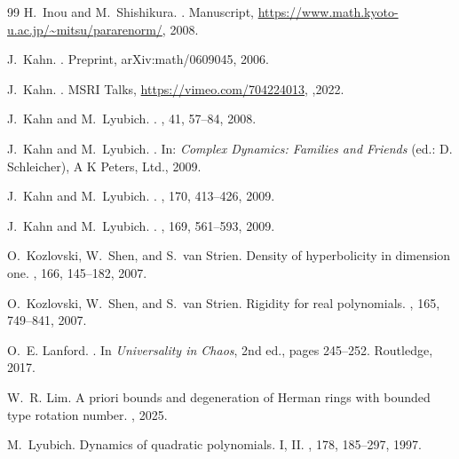 \documentclass[twoside,leqno]{article}
\theoremstyle{plain}
\begin{document}
\begin{thebibliography}{99}
H.~Inou and M.~Shishikura.
.
\newblock Manuscript, \url{https://www.math.kyoto-u.ac.jp/~mitsu/pararenorm/}, 2008.

J.~Kahn.
.
\newblock Preprint, arXiv:math/0609045, 2006.

J.~Kahn.
.
\newblock MSRI Talks, \url{https://vimeo.com/704224013}, 
 ,2022.


J.~Kahn and M.~Lyubich.
.
, 41, 57--84, 2008.

J.~Kahn and M.~Lyubich.
.
\newblock In: {\em Complex Dynamics: Families and Friends} (ed.: D. Schleicher), A K Peters, Ltd., 2009.

J.~Kahn and M.~Lyubich.
.
, 170, 413--426, 2009.

J.~Kahn and M.~Lyubich.
.
, 169, 561--593, 2009.


O.~Kozlovski, W.~Shen, and S.~van Strien.
\newblock Density of hyperbolicity in dimension one.
, 166, 145--182, 2007.


O.~Kozlovski, W.~Shen, and S.~van Strien.
\newblock Rigidity for real polynomials.
, 165, 749--841, 2007.

O.~E. Lanford.
.
\newblock In {\em Universality in Chaos}, 2nd ed., pages 245--252. Routledge, 2017.

W.~R. Lim.
\newblock A priori bounds and degeneration of Herman rings with bounded type rotation number.
, 2025.

M.~Lyubich.
\newblock Dynamics of quadratic polynomials. {I}, {II}.
, 178, 185--297, 1997.


\end{thebibliography}
\end{document}

